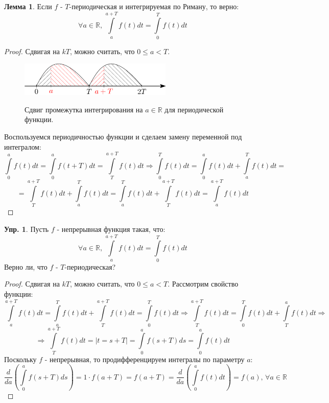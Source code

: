 \documentclass[12pt]{article}
\newcommand{\MR}{\mathbb{R}}
\theoremstyle{definition}
\newtheorem{exrc}{Упр.}
\newtheorem{lemma}{Лемма}
\newcommand{\ddint}[2]{\displaystyle\int\limits_{#1}^{#2}}
\begin{document}
\begin{lemma}
	Если $f$ - $T$-периодическая и интегрируемая по Риману, то верно:
	$$
		\forall a \in \MR, \, \ddint{a}{a +T}f(t)dt = \ddint{0}{T}f(t)dt
	$$
\end{lemma}
\begin{proof}
	Сдвигая на $kT$, можно считать, что $0 \leq a < T$.
	\begin{figure}[H]
		\centering
		\includegraphics[width=0.65\textwidth]{MA3L26_2.png}
		\label{MA3L26_2}
		\caption{Сдвиг промежутка интегрирования на $a \in \MR$ для периодической функции.}
		\label{fig: Сдвиг промежутка интегрирования}
	\end{figure}
	Воспользуемся периодичностью функции и сделаем замену переменной под интегралом:
	$$
		\ddint{0}{a}f(t)dt = \ddint{0}{a}f(t + T)dt = \ddint{T}{a + T}f(t)dt \Rightarrow \ddint{0}{T}f(t)dt  = \ddint{0}{a}f(t)dt + \ddint{a}{T}f(t)dt = 
	$$
	$$
		= \ddint{T}{a + T}f(t)dt + \ddint{a}{T}f(t)dt =  \ddint{a}{T}f(t)dt + \ddint{T}{a + T}f(t)dt  = \ddint{a}{a + T}f(t)dt
	$$
\end{proof}
\begin{exrc}
	Пусть $f$ - непрерывная функция такая, что:
	$$
		\forall a \in \MR, \, \ddint{a}{a+T}f(t)dt = \ddint{0}{T}f(t)dt
	$$
	Верно ли, что $f$ - $T$-периодическая?
\end{exrc}
\begin{proof}
	Сдвигая на $kT$, можно считать, что $0 \leq a < T$. Рассмотрим свойство функции:
	$$
		\ddint{a}{a + T}f(t)dt = \ddint{a}{T}f(t)dt + \ddint{T}{a + T}f(t)dt = \ddint{0}{T}f(t)dt \Rightarrow \ddint{T}{a +T}f(t)dt = \ddint{0}{T}f(t)dt + \ddint{T}{a}f(t)dt \Rightarrow
	$$
	$$
		\Rightarrow \ddint{T}{a + T}f(t)dt = |t = s +T| = \ddint{0}{a}f(s + T)ds = \ddint{0}{a}f(t)dt
	$$
	Поскольку $f$ - непрерывная, то продифференцируем интегралы по параметру $a$:
	$$
		\dfrac{d}{da}\left(\ddint{0}{a}f(s + T)ds\right) = 1{\cdot}f(a + T) = f(a + T) = \dfrac{d}{da}\left(\ddint{0}{a}f(t)dt\right) = f(a) , \, \forall a \in \MR
	$$
\end{proof}
\end{document}
